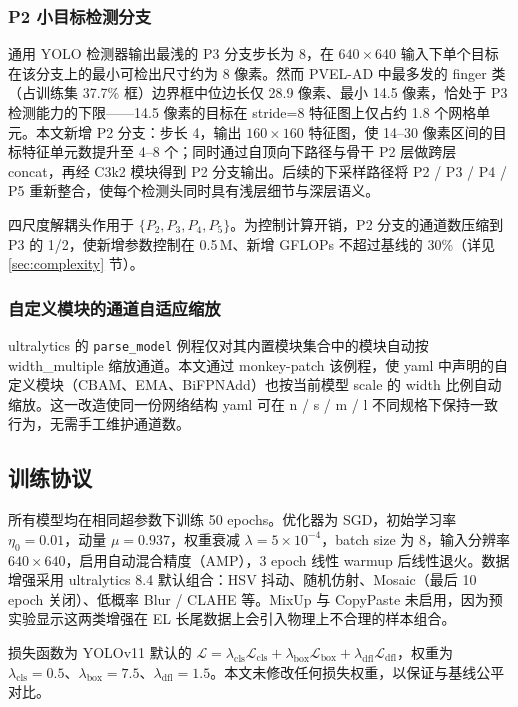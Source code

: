 \documentclass[journal,onecolumn,11pt]{IEEEtran}
\begin{document}
\subsubsection{P2 小目标检测分支}
通用 YOLO 检测器输出最浅的 P3 分支步长为 8，在 $640\times640$ 输入下单个目标在该分支上的最小可检出尺寸约为 8 像素。然而 PVEL-AD 中最多发的 finger 类（占训练集 37.7\% 框）边界框中位边长仅 28.9 像素、最小 14.5 像素，恰处于 P3 检测能力的下限——14.5 像素的目标在 stride=8 特征图上仅占约 1.8 个网格单元。本文新增 P2 分支：步长 4，输出 $160\times160$ 特征图，使 14--30 像素区间的目标特征单元数提升至 4--8 个；同时通过自顶向下路径与骨干 P2 层做跨层 concat，再经 C3k2 模块得到 P2 分支输出。后续的下采样路径将 P2 / P3 / P4 / P5 重新整合，使每个检测头同时具有浅层细节与深层语义。

四尺度解耦头作用于 $\{P_2, P_3, P_4, P_5\}$。为控制计算开销，P2 分支的通道数压缩到 P3 的 1/2，使新增参数控制在 0.5\,M、新增 GFLOPs 不超过基线的 30\%（详见 \ref{sec:complexity} 节）。

\subsubsection{自定义模块的通道自适应缩放}
ultralytics 的 \texttt{parse\_model} 例程仅对其内置模块集合中的模块自动按 width\_multiple 缩放通道。本文通过 monkey-patch 该例程，使 yaml 中声明的自定义模块（CBAM、EMA、BiFPNAdd）也按当前模型 scale 的 width 比例自动缩放。这一改造使同一份网络结构 yaml 可在 n / s / m / l 不同规格下保持一致行为，无需手工维护通道数。

\subsection{训练协议}
\label{sec:training}
所有模型均在相同超参数下训练 50 epochs。优化器为 SGD，初始学习率 $\eta_0 = 0.01$，动量 $\mu = 0.937$，权重衰减 $\lambda = 5\times10^{-4}$，batch size 为 8，输入分辨率 $640\times640$，启用自动混合精度（AMP），3 epoch 线性 warmup 后线性退火。数据增强采用 ultralytics 8.4 默认组合：HSV 抖动、随机仿射、Mosaic（最后 10 epoch 关闭）、低概率 Blur / CLAHE 等。MixUp 与 CopyPaste 未启用，因为预实验显示这两类增强在 EL 长尾数据上会引入物理上不合理的样本组合。

损失函数为 YOLOv11 默认的 $\mathcal{L} = \lambda_\text{cls} \mathcal{L}_\text{cls} + \lambda_\text{box} \mathcal{L}_\text{box} + \lambda_\text{dfl} \mathcal{L}_\text{dfl}$，权重为 $\lambda_\text{cls}=0.5$、$\lambda_\text{box}=7.5$、$\lambda_\text{dfl}=1.5$。本文未修改任何损失权重，以保证与基线公平对比。
\end{document}
